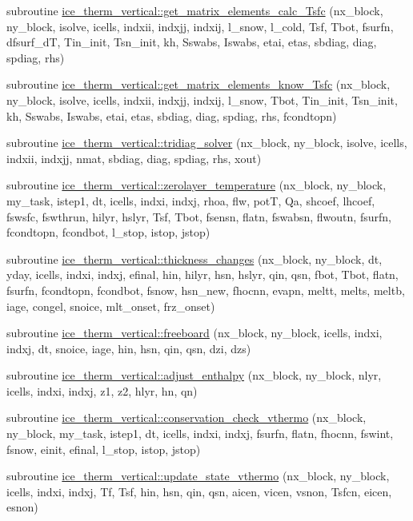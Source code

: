\begin{DoxyCompactItemize}
\item 
subroutine \hyperlink{namespaceice__therm__vertical_a40c9d90a69710b5b555fd78ff83c3009}{ice\_\-therm\_\-vertical::get\_\-matrix\_\-elements\_\-calc\_\-Tsfc} (nx\_\-block, ny\_\-block, isolve, icells, indxii, indxjj, indxij, l\_\-snow, l\_\-cold, Tsf, Tbot, fsurfn, dfsurf\_\-dT, Tin\_\-init, Tsn\_\-init, kh, Sswabs, Iswabs, etai, etas, sbdiag, diag, spdiag, rhs)
\item 
subroutine \hyperlink{namespaceice__therm__vertical_ad636d3bbc26f9737173a670b7c43bfec}{ice\_\-therm\_\-vertical::get\_\-matrix\_\-elements\_\-know\_\-Tsfc} (nx\_\-block, ny\_\-block, isolve, icells, indxii, indxjj, indxij, l\_\-snow, Tbot, Tin\_\-init, Tsn\_\-init, kh, Sswabs, Iswabs, etai, etas, sbdiag, diag, spdiag, rhs, fcondtopn)
\item 
subroutine \hyperlink{namespaceice__therm__vertical_aa5780ef62e3f9b27790b7ba6c47116a0}{ice\_\-therm\_\-vertical::tridiag\_\-solver} (nx\_\-block, ny\_\-block, isolve, icells, indxii, indxjj, nmat, sbdiag, diag, spdiag, rhs, xout)
\item 
subroutine \hyperlink{namespaceice__therm__vertical_a862eb3ec0eaa2a5ae48961730e1ba7ce}{ice\_\-therm\_\-vertical::zerolayer\_\-temperature} (nx\_\-block, ny\_\-block, my\_\-task, istep1, dt, icells, indxi, indxj, rhoa, flw, potT, Qa, shcoef, lhcoef, fswsfc, fswthrun, hilyr, hslyr, Tsf, Tbot, fsensn, flatn, fswabsn, flwoutn, fsurfn, fcondtopn, fcondbot, l\_\-stop, istop, jstop)
\item 
subroutine \hyperlink{namespaceice__therm__vertical_ad24b5fda2cb4af3cda6722209668aa77}{ice\_\-therm\_\-vertical::thickness\_\-changes} (nx\_\-block, ny\_\-block, dt, yday, icells, indxi, indxj, efinal, hin, hilyr, hsn, hslyr, qin, qsn, fbot, Tbot, flatn, fsurfn, fcondtopn, fcondbot, fsnow, hsn\_\-new, fhocnn, evapn, meltt, melts, meltb, iage, congel, snoice, mlt\_\-onset, frz\_\-onset)
\item 
subroutine \hyperlink{namespaceice__therm__vertical_af560526921bc546f96377e533243089f}{ice\_\-therm\_\-vertical::freeboard} (nx\_\-block, ny\_\-block, icells, indxi, indxj, dt, snoice, iage, hin, hsn, qin, qsn, dzi, dzs)
\item 
subroutine \hyperlink{namespaceice__therm__vertical_a6845923f0ff5d01b9c66f9a41d0eb24d}{ice\_\-therm\_\-vertical::adjust\_\-enthalpy} (nx\_\-block, ny\_\-block, nlyr, icells, indxi, indxj, z1, z2, hlyr, hn, qn)
\item 
subroutine \hyperlink{namespaceice__therm__vertical_a4f2f790706910417fe9bbaaa1ad6efa3}{ice\_\-therm\_\-vertical::conservation\_\-check\_\-vthermo} (nx\_\-block, ny\_\-block, my\_\-task, istep1, dt, icells, indxi, indxj, fsurfn, flatn, fhocnn, fswint, fsnow, einit, efinal, l\_\-stop, istop, jstop)
\item 
subroutine \hyperlink{namespaceice__therm__vertical_a64f63f03c5a0e61472486ace19c6b9d5}{ice\_\-therm\_\-vertical::update\_\-state\_\-vthermo} (nx\_\-block, ny\_\-block, icells, indxi, indxj, Tf, Tsf, hin, hsn, qin, qsn, aicen, vicen, vsnon, Tsfcn, eicen, esnon)
\end{DoxyCompactItemize}
